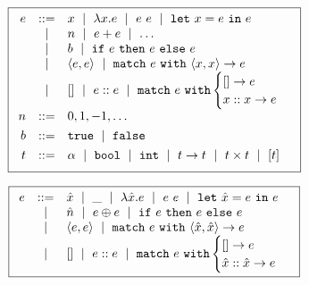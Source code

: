 \begin{figure}
\small
\centering
  \begin{minipage}[c]{\linewidth}
  \[
  \boxed{
  \begin{array}{rcl}
  e & ::=    & x \ \mid\  \lambda x. e \ \mid\  e\ e \ \mid\  \mathtt{let}\ x = e\ \mathtt{in}\ e \\
    & \ \mid\  & n \ \mid\  e + e \ \mid\  \ldots \\
    & \ \mid\  & b \ \mid\  \mathtt{if}\ e\ \mathtt{then}\ e\ \mathtt{else}\ e \\
    & \ \mid\  & \langle e, e \rangle \ \mid\  \mathtt{match}\ e\ \mathtt{with}\ \langle x, x \rangle \to e \\
    & \ \mid\  & \mathtt{[]} \ \mid\  e :: e \ \mid\  \mathtt{match}\ e\ \mathtt{with} \begin{cases} \mathtt{[]} \to e\\ x :: x \to e \end{cases} \\[0.05in]

  n & ::= &  0, 1, -1, \ldots \\[0.05in]

  b & ::= &  \mathtt{true} \ \mid\  \mathtt{false} \\[0.05in]

  t & ::= & \alpha \ \mid\  \mathtt{bool} \ \mid\  \mathtt{int} \ \mid\  t \to t \ \mid\  t \times t \ \mid\  [t] \\[0.05in]
  \end{array}
  }
  \]
  \label{fig:ml-syntax}
  \end{minipage}
  \begin{minipage}[c]{\linewidth}
    \[
    \boxed{
    \begin{array}{rcl}
    e & ::=    & \hat{x} \ \mid\  \_  \ \mid\  \lambda \hat{x}. e \ \mid\  e\ e \ \mid\  \mathtt{let}\ \hat{x} = e\ \mathtt{in}\ e \\
      & \ \mid\  & \hat{n} \ \mid\  e \oplus e \ \mid\  \mathtt{if}\ e\ \mathtt{then}\ e\ \mathtt{else}\ e \\
      & \ \mid\  & \langle e, e \rangle \ \mid\  \mathtt{match}\ e\ \mathtt{with}\ \langle \hat{x}, \hat{x} \rangle \to e \\
      & \ \mid\  & \mathtt{[]} \ \mid\  e :: e \ \mid\  \mathtt{match}\ e\ \mathtt{with} \begin{cases} \mathtt{[]} \to e\\ \hat{x} :: \hat{x} \to e \end{cases} \\[0.05in]
    \end{array}
    }
    \]
    \label{fig:rtl-syntax}
  \end{minipage}
\end{figure}
